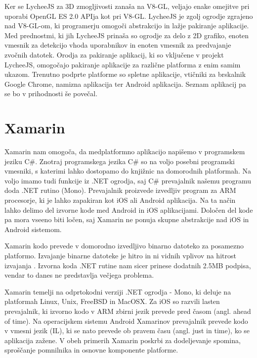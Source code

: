 Ker se LycheeJS za 3D zmogljivosti zanaša na V8-GL, veljajo enake omejitve pri uporabi OpenGL ES 2.0 APIja kot pri V8-GL. LycheeJS je zgolj ogrodje zgrajeno nad V8-GL-om, ki programerju omogoči abstrakcijo in lažje pakiranje aplikacije. Med prednostmi, ki jih LycheeJS prinaša so ogrodje za delo z 2D grafiko, enoten vmesnik za detekcijo vhoda uporabnikov in enoten vmesnik za predvajanje zvočnih datotek. Orodja za pakiranje aplikacij, ki so vključene v projekt LycheeJS, omogočajo pakiranje aplikacije za različne platforma z enim samim ukazom. Trenutno podprte platforme so spletne aplikacije, vtičniki za brskalnik Google Chrome, namizna aplikacija ter Android aplikacija. Seznam aplikacij pa se bo v prihodnosti še povečal.

\section{Xamarin}
\label{sec:xamarin}

Xamarin nam omogoča, da medplatformno aplikacijo napišemo v programskem jeziku C\#. Znotraj programskega jezika C\# so na voljo posebni programski vmesniki, s katerimi lahko dostopamo do knjižnic na domorodnih platformah. Na voljo imamo tudi funkcije iz .NET ogrodja, saj C\# prevajalnik našemu programu doda .NET rutino (Mono). Prevajalnik proizvede izvedljiv program za ARM procesorje, ki je lahko zapakiran kot iOS ali Android aplikacija. Na ta način lahko delimo del izvorne kode med Android in iOS aplikacijami. Določen del kode pa mora vseeno biti ločen, saj Xamarin ne ponuja skupne abstrakcije nad iOS in Android sistemom. 

Xamarin kodo prevede v domorodno izvedljivo binarno datoteko za posamezno platformo. Izvajanje binarne datoteke je hitro in ni vidnih vplivov na hitrost izvajanja \cite{xamarin}. Izvorna koda .NET rutine nam sicer prinese dodatnih 2.5MB podpisa, vendar to danes ne predstavlja večjega problema.

Xamarin temelji na odprtokodni verziji .NET ogrodja - Mono, ki deluje na platformah Linux, Unix, FreeBSD in MacOSX. Za iOS so razvili lasten prevajalnik, ki izvorno kodo v ARM zbirni jezik prevede pred časom (angl. ahead of time). Na operacijskem sistemu Android Xamarinov prevajalnik prevede kodo v vmesni jezik (IL), ki se nato prevede ob pravem času (angl. just in time), ko se aplikacija zažene. V obeh primerih Xamarin poskrbi za dodeljevanje spomina, sproščanje pomnilnika in osnovne komponente platforme. %

